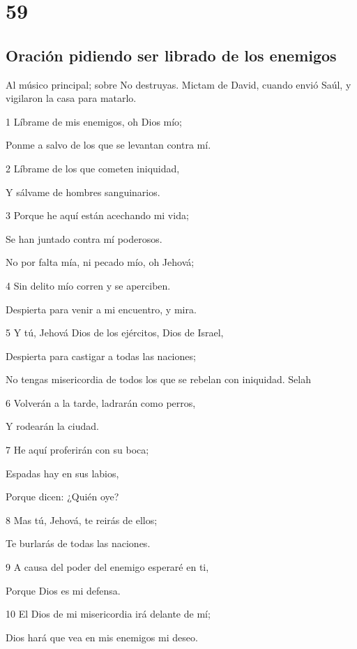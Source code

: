 \chapter{59}

\section*{Oración pidiendo ser librado de los enemigos}

\par Al músico principal; sobre No destruyas. Mictam de David, cuando envió Saúl, y vigilaron la casa para matarlo.

\par 1 Líbrame de mis enemigos, oh Dios mío;
\par Ponme a salvo de los que se levantan contra mí.
\par 2 Líbrame de los que cometen iniquidad,
\par Y sálvame de hombres sanguinarios.
\par 3 Porque he aquí están acechando mi vida;
\par Se han juntado contra mí poderosos.
\par No por falta mía, ni pecado mío, oh Jehová;
\par 4 Sin delito mío corren y se aperciben.
\par Despierta para venir a mi encuentro, y mira.
\par 5 Y tú, Jehová Dios de los ejércitos, Dios de Israel,
\par Despierta para castigar a todas las naciones;
\par No tengas misericordia de todos los que se rebelan con iniquidad. Selah
\par 6 Volverán a la tarde, ladrarán como perros,
\par Y rodearán la ciudad.
\par 7 He aquí proferirán con su boca;
\par Espadas hay en sus labios,
\par Porque dicen: ¿Quién oye?
\par 8 Mas tú, Jehová, te reirás de ellos;
\par Te burlarás de todas las naciones.
\par 9 A causa del poder del enemigo esperaré en ti,
\par Porque Dios es mi defensa.
\par 10 El Dios de mi misericordia irá delante de mí;
\par Dios hará que vea en mis enemigos mi deseo.
